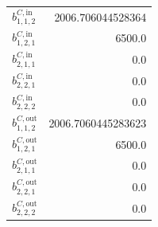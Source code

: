 \documentclass{article}%
\begin{document}
\begin{multicols*}{3}
\begin{supertabular}{lr}
	$b_{1,1,2}^{C,\text{in}}$ & 2006.706044528364 \\%
	$b_{1,2,1}^{C,\text{in}}$ & 6500.0 \\%
	$b_{2,1,1}^{C,\text{in}}$ & 0.0 \\%
	$b_{2,2,1}^{C,\text{in}}$ & 0.0 \\%
	$b_{2,2,2}^{C,\text{in}}$ & 0.0 \\%
	$b_{1,1,2}^{C,\text{out}}$ & 2006.7060445283623 \\%
	$b_{1,2,1}^{C,\text{out}}$ & 6500.0 \\%
	$b_{2,1,1}^{C,\text{out}}$ & 0.0 \\%
	$b_{2,2,1}^{C,\text{out}}$ & 0.0 \\%
	$b_{2,2,2}^{C,\text{out}}$ & 0.0 \\%
\end{supertabular}%
\end{multicols*}%
\end{document}
